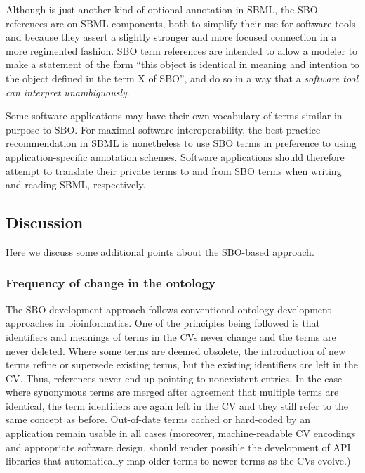 Although  is just another kind of optional
annotation in SBML, the SBO references are  on SBML components, both to simplify their use
for software tools and because they assert a slightly stronger and
more focused connection in a more regimented fashion.  SBO term
references are intended to allow a modeler to make a statement of
the form ``this object is identical in meaning and intention to
the object defined in the term X of SBO'', and do so in a way
that a \emph{software tool can interpret unambiguously}.

Some software applications may have their own vocabulary of terms
similar in purpose to SBO.  For maximal software interoperability,
the best-practice recommendation in SBML is nonetheless to use SBO
terms in preference to using application-specific annotation
schemes.  Software applications should therefore attempt to
translate their private terms to and from SBO terms when writing
and reading SBML, respectively.

\subsection{Discussion}

Here we discuss some additional points about the SBO-based
approach.

\subsubsection{Frequency of change in the ontology}
\label{sec:sbo-frequency-of-change}

The SBO development approach follows conventional ontology
development approaches in bioinformatics.  One of the principles
being followed is that identifiers and meanings of terms in the
CVs never change and the terms are never deleted.  Where some
terms are deemed obsolete, the introduction of new terms refine or
supersede existing terms, but the existing identifiers are left in
the CV.  Thus, references never end up pointing to nonexistent
entries.  In the case where synonymous terms are merged after
agreement that multiple terms are identical, the term identifiers
are again left in the CV and they still refer to the same concept
as before.  Out-of-date terms cached or hard-coded by an
application remain usable in all cases (moreover, 
machine-readable CV encodings and appropriate software design,
should render possible the development of API libraries that automatically map
older terms to newer terms as the CVs evolve.)

